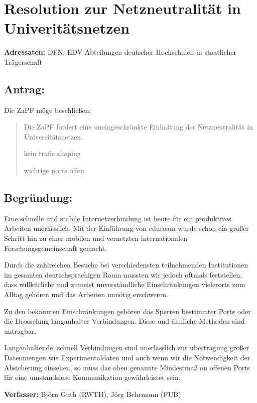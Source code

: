 \documentclass[12pt,oneside]{scrartcl}
\begin{document}
\section*{Resolution zur Netzneutralität in Univeritätsnetzen}

\textbf{Adressaten:} DFN, EDV-Abteilungen deutscher Hochschulen in staatlicher Trägerschaft

\subsection*{Antrag:}
Die ZaPF möge beschließen:
\begin{quote}
Die ZaPF fordert eine uneingeschränkte Einhaltung der Netzneutralität in Universitätsnetzen.

kein trafic shaping

wichtige ports offen
\end{quote}

\subsection*{Begründung:}

Eine schnelle und stabile Internetverbindung ist heute für ein produktives
Arbeiten unerlässlich. Mit der Einführung von eduroam wurde schon ein großer
Schritt hin zu einer mobilen und vernetzten internationalen
Forschungsgemeinschaft gemacht.

Durch die zahlreichen Besuche bei verschiedensten teilnehmenden Institutionen im
gesamten deutschsprachigen Raum mussten wir jedoch oftmals feststellen, dass
willkürliche und zumeist unverständliche Einschränkungen vielerorts zum Alltag
gehören und das Arbeiten unnötig erschweren.

Zu den bekannten Einschränkungen gehören das Sperren bestimmter Ports oder die
Drosselung langanhalter Verbindungen. Diese und ähnliche Methoden sind
untragbar.

Langanhaltende, schnell Verbindungen sind unerlässlich zur übertragung großer
Datenmengen wie Experimentaldaten und auch wenn wir die Notwendigkeit der
Absicherung einsehen, so muss das oben genannte Mindestmaß an offenen Ports für
eine umstandslose Kommunikation gewährleistet sein.

\vspace{1cm}
\textbf{Verfasser:} Björn Guth (RWTH), Jörg Behrmann (FUB)
\end{document}
